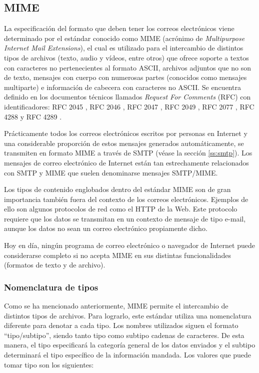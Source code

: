 \subsection{MIME}\label{ss:mime}
La especificación del formato que deben tener los correos electrónicos viene determinado por el estándar conocido como MIME (acrónimo de \textit{Multipurpose Internet Mail Extensions}), el cual es utilizado para el intercambio de distintos tipos de archivos (texto, audio y vídeos, entre otros) que ofrece soporte a textos con caracteres no pertenecientes al formato ASCII, archivos adjuntos que no son de texto, mensajes con cuerpo con numerosas partes (conocidos como mensajes multiparte) e información de cabecera con caracteres no ASCII. Se encuentra definido en los documentos técnicos llamados \textit{Request For Comments} (RFC) con identificadores: RFC 2045 \citep{rfc2045}, RFC 2046 \citep{rfc2046}, RFC 2047 \citep{rfc2047}, RFC 2049 \citep{rfc2049}, RFC 2077 \citep{rfc2077}, RFC 4288 \citep{rfc4288} y RFC 4289 \citep{rfc4289}.

Prácticamente todos los correos electrónicos escritos por personas en Internet y una considerable proporción de estos mensajes generados automáticamente, se transmiten en formato MIME a través de SMTP (véase la sección \ref{ss:smtp}). Los mensajes de correo electrónico de Internet están tan estrechamente relacionados con SMTP y MIME que suelen denominarse mensajes SMTP/MIME.

Los tipos de contenido englobados dentro del estándar MIME son de gran importancia también fuera del contexto de los correos electrónicos. Ejemplos de ello son algunos protocolos de red como el HTTP de la Web. Este protocolo requiere que los datos se transmitan en un contexto de mensaje de tipo e-mail, aunque los datos no sean un correo electrónico propiamente dicho.

Hoy en día, ningún programa de correo electrónico o navegador de Internet puede considerarse completo si no acepta MIME en sus distintas funcionalidades (formatos de texto y de archivo).

\subsubsection{Nomenclatura de tipos}
Como se ha mencionado anteriormente, MIME permite el intercambio de distintos tipos de archivos. Para lograrlo, este estándar utiliza una nomenclatura diferente para denotar a cada tipo. Los nombres utilizados siguen el formato ``tipo/subtipo'', siendo tanto tipo como subtipo cadenas de caracteres. De esta manera, el tipo especificará la categoría general de los datos enviados y el subtipo determinará el tipo específico de la información mandada. Los valores que puede tomar tipo son los siguientes:

